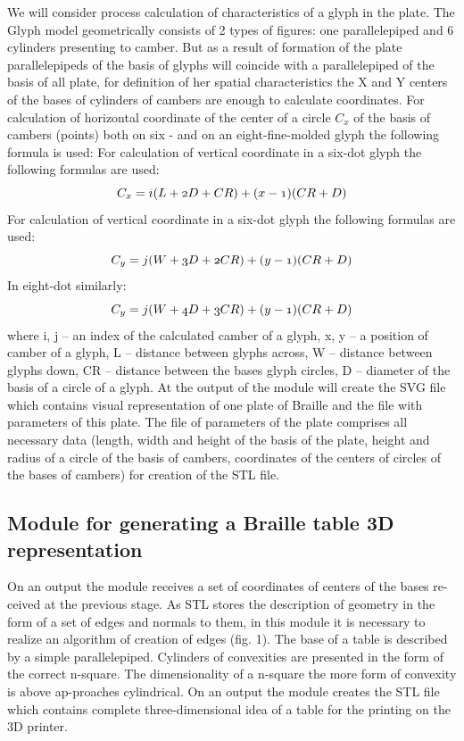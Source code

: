 \documentclass[journal,article,submit,moreauthors,pdftex,10pt,a4paper]{mdpi}
\begin{document}
We will consider process calculation of characteristics of a glyph in the plate. The Glyph model geometrically consists of 2 types of figures: one parallelepiped and 6 cylinders presenting to camber. But as a result of formation of the plate parallelepipeds of the basis of glyphs will coincide with a parallelepiped of the basis of all plate, for definition of her spatial characteristics the X and Y centers of the bases of cylinders of cambers are enough to calculate coordinates. For calculation of horizontal coordinate of the center of a circle $C_{x}$ of the basis of cambers (points) both on six - and on an eight-fine-molded glyph the following formula is used:
For calculation of vertical coordinate in a six-dot glyph the following formulas are used:
\begin{equation}
\mathnormal{C_{x} = i(L+2D+CR)+(x-1)(CR+D)}
\end{equation}
For calculation of vertical coordinate in a six-dot glyph the following formulas are used:
\begin{equation}
\mathnormal{C_{y} = j(W+3D+2CR)+(y-1)(CR+D)	}
\end{equation}
In eight-dot similarly:
\begin{equation}
\mathnormal{C_{y} = j(W+4D+3CR)+(y-1)(CR+D)	}
\end{equation}
where i, j – an index of the calculated camber of a glyph, x, y – a position of camber of a glyph, L – distance between glyphs across, W – distance between glyphs down, CR – distance between the bases glyph circles, D – diameter of the basis of a circle of a glyph.
At the output of the module will create the SVG file which contains visual representation of one plate of Braille and the file with parameters of this plate. The file of parameters of the plate comprises all necessary data (length, width and height of the basis of the plate, height and radius of a circle of the basis of cambers, coordinates of the centers of circles of the bases of cambers) for creation of the STL file.

\subsection{Module for generating a Braille table 3D representation}

On an output the module receives a set of coordinates of centers of the bases re-ceived at the previous stage. As STL stores the description of geometry in the form of a set of edges and normals to them, in this module it is necessary to realize an algorithm of creation of edges (fig. 1). The base of a table is described by a simple parallelepiped. Cylinders of convexities are presented in the form of the correct n-square. The dimensionality of a n-square the more form of convexity is above ap-proaches cylindrical.
On an output the module creates the STL file which contains complete three-dimensional idea of a table for the printing on the 3D printer. 
\end{document}
